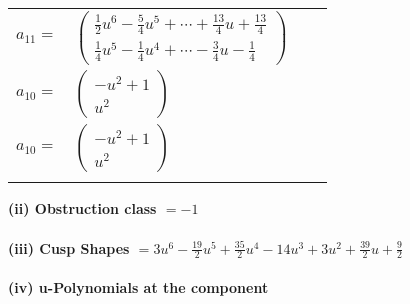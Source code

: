 \documentclass[1p]{elsarticle_modified}
\theoremstyle{definition}
\begin{document}
\begin{tabular}{m{7pt} m{180pt} m{7pt} m{180pt} }
\flushright $a_{11}=$&$\begin{pmatrix}\frac{1}{2} u^6-\frac{5}{4} u^5+\cdots+\frac{13}{4} u+\frac{13}{4}\\\frac{1}{4} u^5-\frac{1}{4} u^4+\cdots-\frac{3}{4} u-\frac{1}{4}\end{pmatrix}$ \\
\flushright $a_{10}=$&$\begin{pmatrix}- u^2+1\\u^2\end{pmatrix}$\\ \flushright $a_{10}=$&$\begin{pmatrix}- u^2+1\\u^2\end{pmatrix}$\\&\end{tabular}
\flushleft \textbf{(ii) Obstruction class $= -1$}\\~\\
\flushleft \textbf{(iii) Cusp Shapes $= 3 u^6-\frac{19}{2} u^5+\frac{35}{2} u^4-14 u^3+3 u^2+\frac{39}{2} u+\frac{9}{2}$}\\~\\
\newpage\renewcommand{\arraystretch}{1}
\flushleft \textbf{(iv) u-Polynomials at the component}\newline \\
\end{document}
